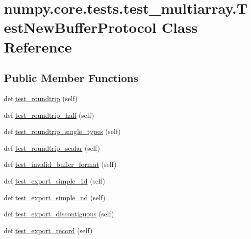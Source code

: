 \hypertarget{classnumpy_1_1core_1_1tests_1_1test__multiarray_1_1TestNewBufferProtocol}{}\section{numpy.\+core.\+tests.\+test\+\_\+multiarray.\+Test\+New\+Buffer\+Protocol Class Reference}
\label{classnumpy_1_1core_1_1tests_1_1test__multiarray_1_1TestNewBufferProtocol}
\subsection*{Public Member Functions}
\begin{DoxyCompactItemize}
\item 
def \hyperlink{classnumpy_1_1core_1_1tests_1_1test__multiarray_1_1TestNewBufferProtocol_a442067b5e9457f46c6726ac2894711c3}{test\+\_\+roundtrip} (self)
\item 
def \hyperlink{classnumpy_1_1core_1_1tests_1_1test__multiarray_1_1TestNewBufferProtocol_a796c78aff7b40ddfdc4429d75e811f31}{test\+\_\+roundtrip\+\_\+half} (self)
\item 
def \hyperlink{classnumpy_1_1core_1_1tests_1_1test__multiarray_1_1TestNewBufferProtocol_a61fc7f5552d8733eea4a9e14cae9f1f4}{test\+\_\+roundtrip\+\_\+single\+\_\+types} (self)
\item 
def \hyperlink{classnumpy_1_1core_1_1tests_1_1test__multiarray_1_1TestNewBufferProtocol_a8ac3b9b8d4da6dc68f328d8b534d48a2}{test\+\_\+roundtrip\+\_\+scalar} (self)
\item 
def \hyperlink{classnumpy_1_1core_1_1tests_1_1test__multiarray_1_1TestNewBufferProtocol_a1455266f29d130a261ef4147470bdb74}{test\+\_\+invalid\+\_\+buffer\+\_\+format} (self)
\item 
def \hyperlink{classnumpy_1_1core_1_1tests_1_1test__multiarray_1_1TestNewBufferProtocol_af2396630065397e9bdd42ad516f6c629}{test\+\_\+export\+\_\+simple\+\_\+1d} (self)
\item 
def \hyperlink{classnumpy_1_1core_1_1tests_1_1test__multiarray_1_1TestNewBufferProtocol_a15eebf653ffafaafdb9a91be1103cef1}{test\+\_\+export\+\_\+simple\+\_\+nd} (self)
\item 
def \hyperlink{classnumpy_1_1core_1_1tests_1_1test__multiarray_1_1TestNewBufferProtocol_abe42d47421653e97c287c7867e0383b7}{test\+\_\+export\+\_\+discontiguous} (self)
\item 
def \hyperlink{classnumpy_1_1core_1_1tests_1_1test__multiarray_1_1TestNewBufferProtocol_a679efd8d5863f7dc6d84d1185dc8bddd}{test\+\_\+export\+\_\+record} (self)

\end{DoxyCompactItemize}
